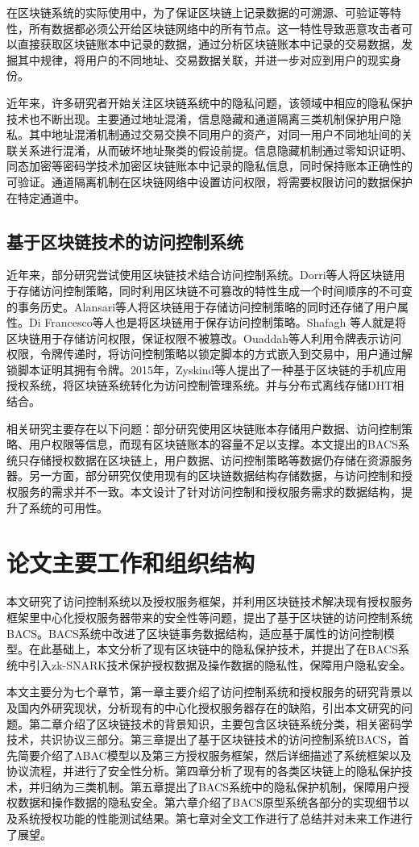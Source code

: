 在区块链系统的实际使用中，为了保证区块链上记录数据的可溯源、可验证等特性，所有数据都必须公开给区块链网络中的所有节点。这一特性导致恶意攻击者可以直接获取区块链账本中记录的数据，通过分析区块链账本中记录的交易数据，发掘其中规律，将用户的不同地址、交易数据关联，并进一步对应到用户的现实身份。 

近年来，许多研究者开始关注区块链系统中的隐私问题，该领域中相应的隐私保护技术也不断出现。主要通过地址混淆，信息隐藏和通道隔离三类机制保护用户隐私。其中地址混淆机制通过交易交换不同用户的资产，对同一用户不同地址间的关联关系进行混淆，从而破坏地址聚类的假设前提。信息隐藏机制通过零知识证明、同态加密等密码学技术加密区块链账本中记录的隐私信息，同时保持账本正确性的可验证。通道隔离机制在区块链网络中设置访问权限，将需要权限访问的数据保护在特定通道中。

\subsection{基于区块链技术的访问控制系统}

近年来，部分研究尝试使用区块链技术结合访问控制系统。Dorri等人将区块链用于存储访问控制策略，同时利用区块链不可篡改的特性生成一个时间顺序的不可变的事务历史。Alansari等人将区块链用于存储访问控制策略的同时还存储了用户属性。Di Francesco等人也是将区块链用于保存访问控制策略。Shafagh 等人就是将区块链用于存储访问权限，保证权限不被篡改。Ouaddah等人利用令牌表示访问权限，令牌传递时，将访问控制策略以锁定脚本的方式嵌入到交易中，用户通过解锁脚本证明其拥有令牌。2015年，Zyskind等人提出了一种基于区块链的手机应用授权系统，将区块链系统转化为访问控制管理系统。并与分布式离线存储DHT相结合。

相关研究主要存在以下问题：部分研究使用区块链账本存储用户数据、访问控制策略、用户权限等信息，而现有区块链账本的容量不足以支撑。本文提出的BACS系统只存储授权数据在区块链上，用户数据、访问控制策略等数据仍存储在资源服务器。另一方面，部分研究仅使用现有的区块链数据结构存储数据，与访问控制和授权服务的需求并不一致。本文设计了针对访问控制和授权服务需求的数据结构，提升了系统的可用性。

\section{论文主要工作和组织结构}

本文研究了访问控制系统以及授权服务框架，并利用区块链技术解决现有授权服务框架里中心化授权服务器带来的安全性等问题，提出了基于区块链的访问控制系统BACS。BACS系统中改进了区块链事务数据结构，适应基于属性的访问控制模型。在此基础上，本文分析了现有区块链中的隐私保护技术，并提出了在BACS系统中引入zk-SNARK技术保护授权数据及操作数据的隐私性，保障用户隐私安全。

本文主要分为七个章节，第一章主要介绍了访问控制系统和授权服务的研究背景以及国内外研究现状，分析现有的中心化授权服务器存在的缺陷，引出本文研究的问题。第二章介绍了区块链技术的背景知识，主要包含区块链系统分类，相关密码学技术，共识协议三部分。第三章提出了基于区块链技术的访问控制系统BACS，首先简要介绍了ABAC模型以及第三方授权服务框架，然后详细描述了系统框架以及协议流程，并进行了安全性分析。第四章分析了现有的各类区块链上的隐私保护技术，并归纳为三类机制。第五章提出了BACS系统中的隐私保护机制，保障用户授权数据和操作数据的隐私安全。第六章介绍了BACS原型系统各部分的实现细节以及系统授权功能的性能测试结果。第七章对全文工作进行了总结并对未来工作进行了展望。
